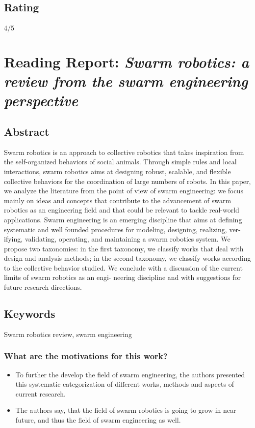     \subsection*{Rating}
    4/5
    
    
    \newpage
    \section{Reading Report: \emph{Swarm robotics: a review from the swarm engineering perspective}}
    \cite{Brambilla2013}
    
    \subsection*{Abstract}
    Swarm robotics is an approach to collective robotics that takes inspiration from
    the self-organized behaviors of social animals. Through simple rules and local interactions,
    swarm robotics aims at designing robust, scalable, and flexible collective behaviors for the
    coordination of large numbers of robots. In this paper, we analyze the literature from the
    point of view of swarm engineering: we focus mainly on ideas and concepts that contribute
    to the advancement of swarm robotics as an engineering field and that could be relevant
    to tackle real-world applications. Swarm engineering is an emerging discipline that aims at
    defining systematic and well founded procedures for modeling, designing, realizing, ver-
    ifying, validating, operating, and maintaining a swarm robotics system. We propose two
    taxonomies: in the first taxonomy, we classify works that deal with design and analysis
    methods; in the second taxonomy, we classify works according to the collective behavior
    studied. We conclude with a discussion of the current limits of swarm robotics as an engi-
    neering discipline and with suggestions for future research directions.
    
    \subsection*{Keywords}
    Swarm robotics review, swarm engineering
    
    
     
    \subsubsection*{What are the motivations for this work?}
    \begin{itemize}
        \item To further the develop the field of swarm engineering, the authors presented this systematic categorization of different works, methods and aspects of current research.
        \item The authors say, that the field of swarm robotics is going to grow in near future, and thus the field of swarm engineering as well.
    \end{itemize}
